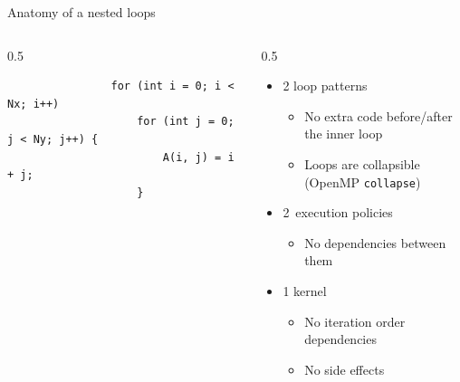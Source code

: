 \documentclass[
    aspectratio=169,
    \createHandout
]{beamer}
\begin{document}
\begin{frame}[fragile]{Anatomy of a nested loops}
    \begin{columns}
        \begin{column}{0.5\linewidth}
            \begin{verbatim}
                for (int i = 0; i < Nx; i++)
                    for (int j = 0; j < Ny; j++) {
                        A(i, j) = i + j;
                    }
            \end{verbatim}
        \end{column}
        \begin{column}{0.5\linewidth}
            \begin{itemize}
                \item 2 loop patterns
                \begin{itemize}
                    \item No extra code before/after the inner loop
                    \item Loops are collapsible (OpenMP \texttt{collapse})
                \end{itemize}
                \item 2 execution policies
                \begin{itemize}
                    \item No dependencies between them
                \end{itemize}
                \item 1 kernel
                \begin{itemize}
                    \item No iteration order dependencies
                    \item No side effects
                \end{itemize}
            \end{itemize}
        \end{column}
    \end{columns}
\end{frame}

\end{document}
